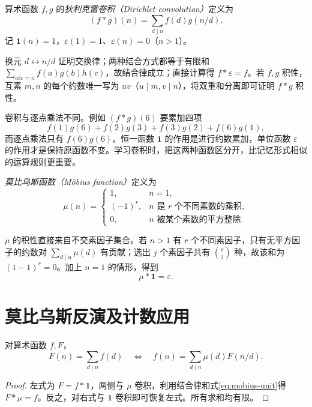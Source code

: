 \begin{definition}
算术函数 $f,g$ 的\emph{狄利克雷卷积（Dirichlet convolution）}定义为
\begin{equation}
 (f*g)(n)=\sum_{d\mid n}f(d)g(n/d).
 \label{eq:dirichlet-convolution}
\end{equation}
记 $\mathbf1(n)=1$，$\varepsilon(1)=1$、$\varepsilon(n)=0$（$n>1$）。
\end{definition}

换元 $d\leftrightarrow n/d$ 证明交换律；两种结合方式都等于有限和 $\sum_{abc=n}f(a)g(b)h(c)$，故结合律成立；直接计算得 $f*\varepsilon=f$。若 $f,g$ 积性，互素 $m,n$ 的每个约数唯一写为 $uv$（$u\mid m,v\mid n$），将双重和分离即可证明 $f*g$ 积性。

卷积与逐点乘法不同。例如 $(f*g)(6)$ 要累加四项
\[
 f(1)g(6)+f(2)g(3)+f(3)g(2)+f(6)g(1),
\]
而逐点乘法只有 $f(6)g(6)$。恒一函数 $\mathbf1$ 的作用是进行约数累加，单位函数 $\varepsilon$ 的作用才是保持原函数不变。学习卷积时，把这两种函数区分开，比记忆形式相似的运算规则更重要。

\begin{definition}
\emph{莫比乌斯函数（Möbius function）}定义为
\[
 \mu(n)=
 \begin{cases}
 1,&n=1,\\
 (-1)^r,&n\text{ 是 }r\text{ 个不同素数的乘积},\\
 0,&n\text{ 被某个素数的平方整除}.
 \end{cases}
\]
\end{definition}

$\mu$ 的积性直接来自不交素因子集合。若 $n>1$ 有 $r$ 个不同素因子，只有无平方因子的约数对 $\sum_{d\mid n}\mu(d)$ 有贡献；选出 $j$ 个素因子共有 $\binom rj$ 种，故该和为 $(1-1)^r=0$。加上 $n=1$ 的情形，得到
\begin{equation}
 \mu*\mathbf1=\varepsilon.
 \label{eq:mobius-unit}
\end{equation}

\section{莫比乌斯反演及计数应用}

\begin{theorem}[莫比乌斯反演]
\label{thm:mobius-inversion}
对算术函数 $f,F$，
\begin{equation}
 F(n)=\sum_{d\mid n}f(d)
 \quad\Longleftrightarrow\quad
 f(n)=\sum_{d\mid n}\mu(d)F(n/d).
 \label{eq:mobius-inversion}
\end{equation}
\end{theorem}
\begin{proof}
左式为 $F=f*\mathbf1$，两侧与 $\mu$ 卷积，利用结合律和式\eqref{eq:mobius-unit}得 $F*\mu=f$。反之，对右式与 $\mathbf1$ 卷积即可恢复左式。所有求和均有限。
\end{proof}

